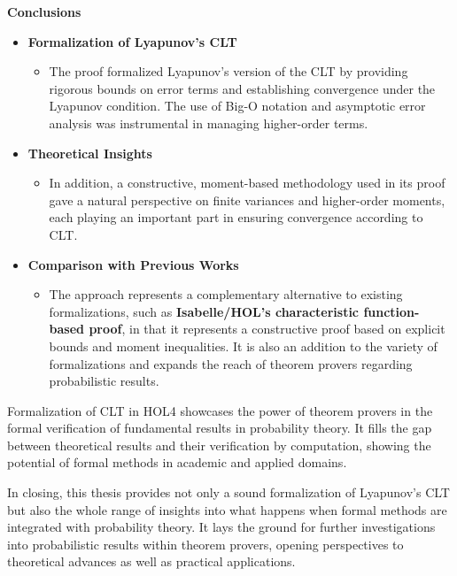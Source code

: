 \textbf{Conclusions}
\begin{itemize}
    \item \textbf{Formalization of Lyapunov's CLT}
    \begin{itemize}
        \item The proof formalized Lyapunov's version of the CLT by providing rigorous bounds on error terms and establishing convergence under the Lyapunov condition. The use of Big-O notation and asymptotic error analysis was instrumental in managing higher-order terms.
    \end{itemize}

    \item \textbf{Theoretical Insights}
    \begin{itemize}
        \item In addition, a constructive, moment-based methodology used in its proof gave a natural perspective on finite variances and higher-order moments, each playing an important part in ensuring convergence according to CLT.
    \end{itemize}

    \item \textbf{Comparison with Previous Works}
    \begin{itemize}
        \item The approach represents a complementary alternative to existing formalizations, such as \textbf{Isabelle/HOL's characteristic function-based proof}, in that it represents a constructive proof based on explicit bounds and moment inequalities. It is also an addition to the variety of formalizations and expands the reach of theorem provers regarding probabilistic results.
    \end{itemize}

\end{itemize}
Formalization of CLT in HOL4 showcases the power of theorem provers in the formal verification of fundamental results in probability theory. It fills the gap between theoretical results and their verification by computation, showing the potential of formal methods in academic and applied domains.

In closing, this thesis provides not only a sound formalization of Lyapunov's CLT but also the whole range of insights into what happens when formal methods are integrated with probability theory. It lays the ground for further investigations into probabilistic results within theorem provers, opening perspectives to theoretical advances as well as practical applications.